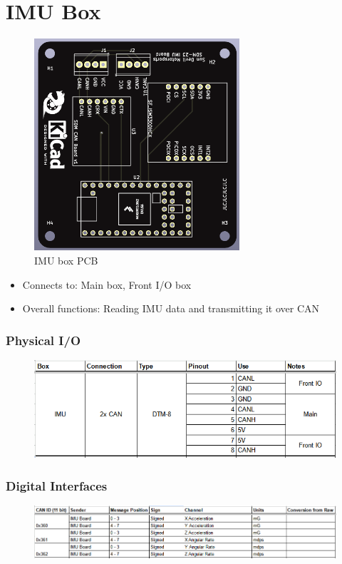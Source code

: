 \section{IMU Box}
\begin{figure}[H]
    \centering
    \includegraphics[width=3in]{images/pcbimu.png}
    \caption{IMU box PCB}
    \label{fig:pcbimu}
\end{figure}
\begin{itemize}
    \item Connects to: Main box, Front I/O box
    \item Overall functions: Reading IMU data and transmitting it over CAN
\end{itemize}
\subsubsection{Physical I/O}
\begin{figure}[H]
    \centering
    \includegraphics[width=7in]{images/pioimu.png}
\end{figure}
\subsubsection{Digital Interfaces}
\begin{figure}[H]
    \centering
    \includegraphics[width=7in]{images/dioimu.png}
\end{figure}

